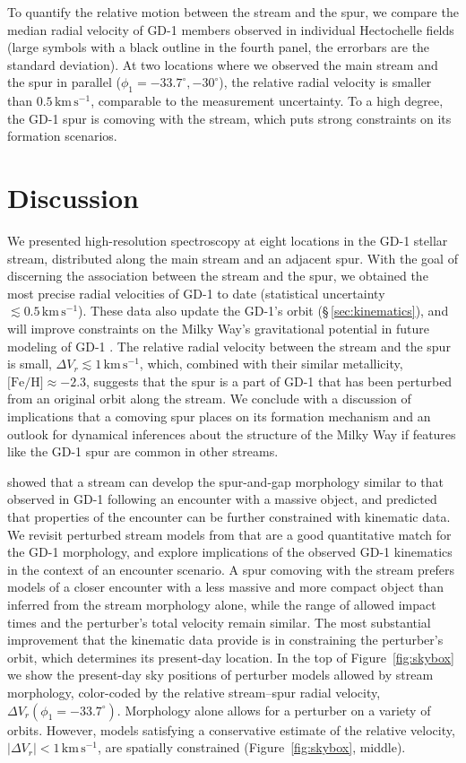 \documentclass[twocolumn]{aastex63}
\newcommand{\kms}{\ensuremath{\textrm{km}\,\textrm{s}^{-1}}}
\newcommand{\feh}{\ensuremath{\textrm{[Fe/H]}}}
\begin{document}
To quantify the relative motion between the stream and the spur, we compare the median radial velocity of GD-1 members observed in individual Hectochelle fields (large symbols with a black outline in the fourth panel, the errorbars are the standard deviation).
At two locations where we observed the main stream and the spur in parallel ($\phi_1=-33.7^\circ, -30^\circ$), the relative radial velocity is smaller than $0.5\,\kms$, comparable to the measurement uncertainty.
To a high degree, the GD-1 spur is comoving with the stream, which puts strong constraints on its formation scenarios.


\section{Discussion}
\label{sec:discussion}

We presented high-resolution spectroscopy at eight locations in the GD-1 stellar stream, distributed along the main stream and an adjacent spur.
With the goal of discerning the association between the stream and the spur, we obtained the most precise radial velocities of GD-1 to date (statistical uncertainty $\lesssim0.5\,\kms$).
These data also update the GD-1's orbit (\S\,\ref{sec:kinematics}), and will improve constraints on the Milky Way's gravitational potential in future modeling of GD-1 \citep[similar to, e.g.,][]{koposov2010, bowden2015, bovy2016}.
The relative radial velocity between the stream and the spur is small, $\Delta V_r\lesssim1\,\kms$, which, combined with their similar metallicity, $\feh\approx-2.3$, suggests that the spur is a part of GD-1 that has been perturbed from an original orbit along the stream.
We conclude with a discussion of implications that a comoving spur places on its formation mechanism and an outlook for dynamical inferences about the structure of the Milky Way if features like the GD-1 spur are common in other streams.

\citet{bonaca2019a} showed that a stream can develop the spur-and-gap morphology similar to that observed in GD-1 following an encounter with a massive object, and predicted that properties of the encounter can be further constrained with kinematic data.
We revisit perturbed stream models from \citet{bonaca2019a} that are a good quantitative match for the GD-1 morphology, and explore implications of the observed GD-1 kinematics in the context of an encounter scenario.
A spur comoving with the stream prefers models of a closer encounter with a less massive and more compact object than inferred from the stream morphology alone, while the range of allowed impact times and the perturber's total velocity remain similar.
The most substantial improvement that the kinematic data provide is in constraining the perturber's orbit, which determines its present-day location.
In the top of Figure~\ref{fig:skybox} we show the present-day sky positions of perturber models allowed by stream morphology, color-coded by the relative stream--spur radial velocity, $\Delta V_r(\phi_1=-33.7^\circ)$.
Morphology alone allows for a perturber on a variety of orbits.
However, models satisfying a conservative estimate of the relative velocity, $|\Delta V_r|<1\,\kms$, are spatially constrained (Figure~\ref{fig:skybox}, middle).
\end{document}
